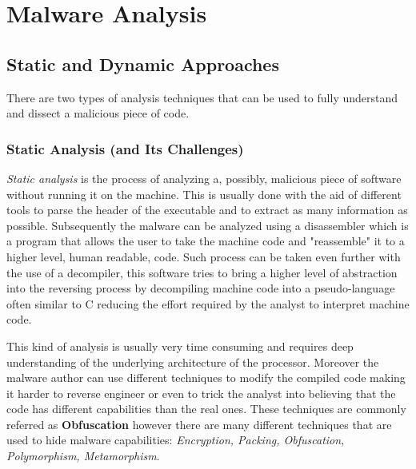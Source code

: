 
\chapter{Malware Analysis}
\label{chap:1}


\section{Static and Dynamic Approaches}
There are two types of analysis techniques that can be used to fully understand and dissect a malicious piece of code.

\subsection*{Static Analysis (and Its Challenges)}

\textit{Static analysis} is the process of analyzing a, possibly, malicious piece of software without running it on the machine. This is usually done with the aid of different tools to parse the header of the executable and to extract as many information as possible. Subsequently the malware can be analyzed using a disassembler which is a program that allows the user to take the machine code and "reassemble" it to a higher level, human readable, code. Such process can be taken even further with the use of a decompiler, this software tries to bring a higher level of abstraction into the reversing process by decompiling machine code into a pseudo-language often similar to C reducing the effort required by the analyst to interpret machine code.

This kind of analysis is usually very time consuming and requires deep understanding of the underlying architecture of the processor. Moreover the malware author can use different techniques to modify the compiled code making it harder to reverse engineer or even to trick the analyst into believing that the code has different capabilities than the real ones. These techniques are commonly referred as \textbf{Obfuscation} however there are many different techniques that are used to hide malware capabilities: \textit{Encryption, Packing, Obfuscation, Polymorphism, Metamorphism}.\cite{Ye2017ASO}


